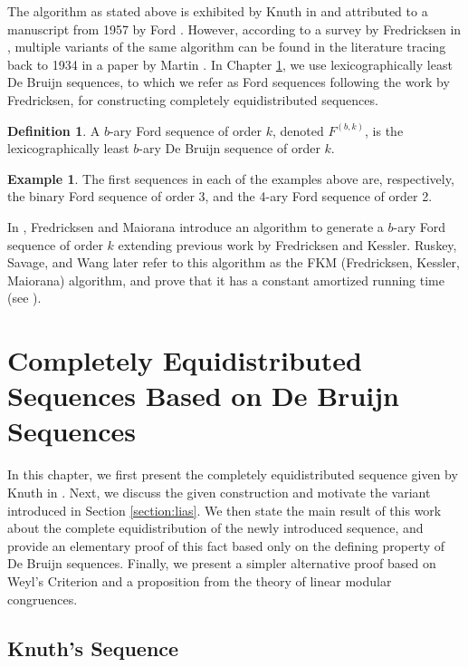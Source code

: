 \documentclass[11pt,a4paper]{tesis}
\theoremstyle{plain}
\theoremstyle{definition}
\newtheorem*{definition*}{Definition}
\newtheorem*{exmp*}{Example}
\begin{document}
The algorithm as stated above is exhibited by Knuth in \cite{knuth-1965} and attributed to a manuscript from 1957 by Ford \cite{ford-1957}. However, according to a survey by Fredricksen in \cite{fredricksen-1982}, multiple variants of the same algorithm can be found in the literature tracing back to 1934 in a paper by Martin \cite{martin-1934}. In Chapter \ref{chapter:cesbofs}, we use lexicographically least De Bruijn sequences, to which we refer as Ford sequences following the work by Fredricksen, for constructing completely equidistributed sequences.

\begin{definition*}
  A $b$-ary Ford sequence of order $k$, denoted $F^{(b, k)}$, is the lexicographically least $b$-ary De Bruijn sequence of order $k$.
\end{definition*}

\begin{exmp*}
  The first sequences in each of the examples above are, respectively, the binary Ford sequence of order 3, and the 4-ary Ford sequence of order 2.
\end{exmp*}

In \cite{fredricksen-1978}, Fredricksen and Maiorana introduce an algorithm to generate a $b$-ary Ford sequence of order $k$ extending previous work by Fredricksen and Kessler. Ruskey, Savage, and Wang later refer to this algorithm as the FKM (Fredricksen, Kessler, Maiorana) algorithm, and prove that it has a constant amortized running time (see \cite{ruskey-1991}).

\chapter{Completely Equidistributed Sequences Based on De Bruijn Sequences}\label{chapter:cesbofs}

In this chapter, we first present the completely equidistributed sequence given by Knuth in \cite{knuth-1965}. Next, we discuss the given construction and motivate the variant introduced in Section \ref{section:lias}. We then state the main result of this work about the complete equidistribution of the newly introduced sequence, and provide an elementary proof of this fact based only on the defining property of De Bruijn sequences. Finally, we present a simpler alternative proof based on Weyl's Criterion and a proposition from the theory of linear modular congruences.

\section{Knuth's Sequence}\label{section:knuth-sequence}
\end{document}
